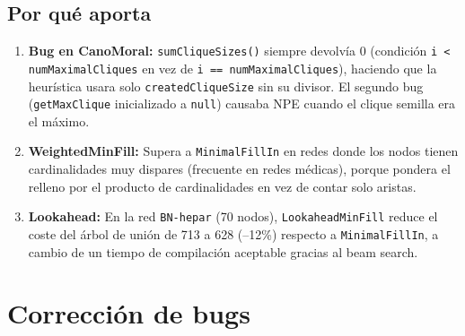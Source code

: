 \documentclass[11pt,a4paper]{article}
\begin{document}
\subsection{Por qué aporta}

\begin{enumerate}
  \item \textbf{Bug en CanoMoral:} \texttt{sumCliqueSizes()} siempre devolvía 0 (condición \texttt{i < numMaximalCliques} en vez de \texttt{i == numMaximalCliques}), haciendo que la heurística usara solo \texttt{createdCliqueSize} sin su divisor. El segundo bug (\texttt{getMaxClique} inicializado a \texttt{null}) causaba NPE cuando el clique semilla era el máximo.
  \item \textbf{WeightedMinFill:} Supera a \texttt{MinimalFillIn} en redes donde los nodos tienen cardinalidades muy dispares (frecuente en redes médicas), porque pondera el relleno por el producto de cardinalidades en vez de contar solo aristas.
  \item \textbf{Lookahead:} En la red \texttt{BN-hepar} (70 nodos), \texttt{LookaheadMinFill} reduce el coste del árbol de unión de 713 a 628 (--12\%) respecto a \texttt{MinimalFillIn}, a cambio de un tiempo de compilación aceptable gracias al beam search.
\end{enumerate}

\section{Corrección de bugs}
\end{document}
